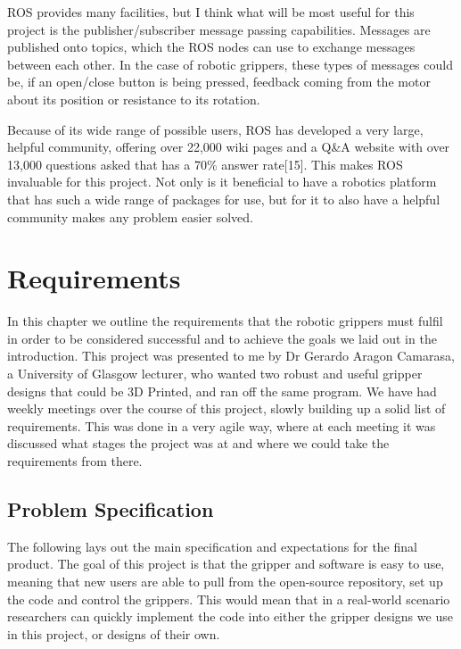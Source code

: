 \documentclass{l4proj}
\begin{document}
ROS provides many facilities, but I think what will be most useful for this project is the publisher/subscriber message passing capabilities. Messages are published onto topics, which the ROS nodes can use to exchange messages between each other. In the case of robotic grippers, these types of messages could be, if an open/close button is being pressed, feedback coming from the motor about its position or resistance to its rotation.

Because of its wide range of possible users, ROS has developed a very large, helpful community, offering over 22,000 wiki pages and a Q\&A website with over 13,000 questions asked that has a 70\% answer rate[15]. This makes ROS invaluable for this project. Not only is it beneficial to have a robotics platform that has such a wide range of packages for use, but for it to also have a helpful community makes any problem easier solved.




\chapter{Requirements}
In this chapter we outline the requirements that the robotic grippers must fulfil in order to be considered successful and to achieve the goals we laid out in the introduction. This project was presented to me by Dr Gerardo Aragon Camarasa, a University of Glasgow lecturer, who wanted two robust and useful gripper designs that could be 3D Printed, and ran off the same program. We have had weekly meetings over the course of this project, slowly building up a solid list of requirements. This was done in a very agile way, where at each meeting it was discussed what stages the project was at and where we could take the requirements from there. 

\section{Problem Specification}
The following lays out the main specification and expectations for the final product. The goal of this project is that the gripper and software is easy to use, meaning that new users are able to pull from the open-source repository, set up the code and control the grippers. This would mean that in a real-world scenario researchers can quickly implement the code into either the  gripper designs we use in this project, or designs of their own. 
\end{document}
